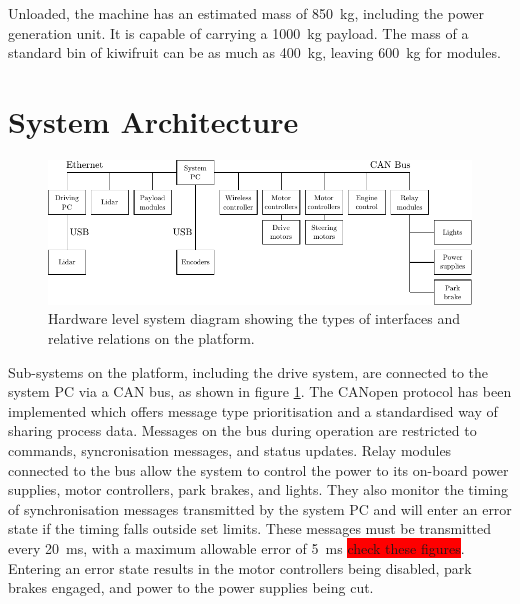 \documentclass[preprint,authoryear,12pt]{elsarticle}
\begin{document}
    Unloaded, the machine has an estimated mass of \SI{850}{\kilo\gram}, including the power generation unit.
    It is capable of carrying a \SI{1000}{\kilo\gram} payload.
    The mass of a standard bin of kiwifruit can be as much as \SI{400}{\kilo\gram}, leaving \SI{600}{\kilo\gram} for modules.

\section{System Architecture}
\label{sect:hardware}

    \newcommand{\rpm}{\raisebox{.2ex}{$\scriptstyle\pm$}}
    
    \begin{figure}[htb]
        \centering
        \includegraphics[width=\linewidth]{imgs/system_diagram/diagram_v3.pdf}
        \caption{Hardware level system diagram showing the types of interfaces and relative relations on the platform.}
        \label{fig:system_diagram}
    \end{figure}
    Sub-systems on the platform, including the drive system, are connected to the system PC via a CAN bus, as shown in figure \ref{fig:system_diagram}.
    The CANopen protocol has been implemented which offers message type prioritisation and a standardised way of sharing process data.
    Messages on the bus during operation are restricted to commands, syncronisation messages, and status updates.
    Relay modules connected to the bus allow the system to control the power to its on-board power supplies, motor controllers, park brakes, and lights.
    They also monitor the timing of synchronisation messages transmitted by the system PC and will enter an error state if the timing falls outside set limits.
    These messages must be transmitted every \SI{20}{\milli\second}, with a maximum allowable error of \rpm \SI{5}{\milli\second} \colorbox{red}{check these figures}.
    Entering an error state results in the motor controllers being disabled, park brakes engaged, and power to the power supplies being cut.
\end{document}
